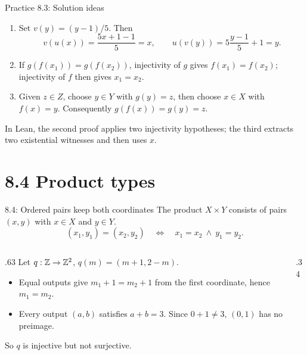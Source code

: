 \begin{frame}{Practice 8.3: Solution ideas}
\begin{enumerate}
\item Set $v(y)=(y-1)/5$. Then
\[
 v(u(x))=\frac{5x+1-1}{5}=x,
 \qquad u(v(y))=5\frac{y-1}{5}+1=y.
\]
\item If $g(f(x_1))=g(f(x_2))$, injectivity of $g$ gives
$f(x_1)=f(x_2)$; injectivity of $f$ then gives $x_1=x_2$.
\item Given $z\in Z$, choose $y\in Y$ with $g(y)=z$, then choose $x\in X$
with $f(x)=y$. Consequently $g(f(x))=g(y)=z$.
\end{enumerate}
In Lean, the second proof applies two injectivity hypotheses;
the third extracts two existential witnesses and then uses $x$.
\end{frame}

\section{8.4 Product types}
\begin{frame}{8.4: Ordered pairs keep both coordinates}
The product $X\times Y$ consists of pairs $(x,y)$ with $x\in X$ and $y\in Y$.
\[
 (x_1,y_1)=(x_2,y_2)\quad\Longleftrightarrow\quad x_1=x_2\ \land\ y_1=y_2.
\]
\begin{columns}[T]
\begin{column}{.63\textwidth}
Let $q:\mathbb{Z}\to\mathbb{Z}^2$, $q(m)=(m+1,2-m)$.
\begin{itemize}
\item Equal outputs give $m_1+1=m_2+1$ from the first coordinate, hence $m_1=m_2$.
\item Every output $(a,b)$ satisfies $a+b=3$.
Since $0+1\ne3$, $(0,1)$ has no preimage.
\end{itemize}
So $q$ is injective but not surjective.
\end{column}
\begin{column}{.34\textwidth}
\centering
{}
\end{column}
\end{columns}
\end{frame}

